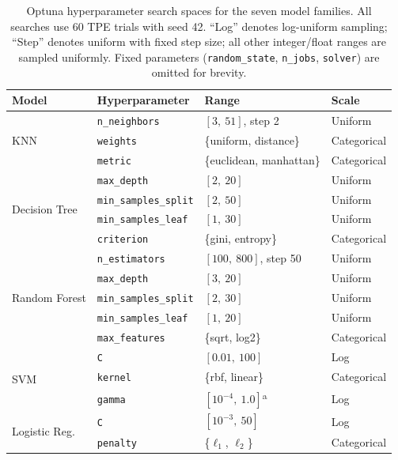 \begin{table}[ht!]
\centering
\caption[Optuna search spaces by model family]{Optuna hyperparameter search spaces for the seven model families.
All searches use 60 TPE trials with seed 42.
``Log'' denotes log-uniform sampling; ``Step'' denotes uniform with fixed step size; all other integer/float ranges are sampled uniformly.
Fixed parameters (\texttt{random\_state}, \texttt{n\_jobs}, \texttt{solver}) are omitted for brevity.}
\label{tab:optuna_spaces}
\footnotesize
\begin{tabular}{l l l l}
\toprule
Model & Hyperparameter & Range & Scale \\
\midrule
\multirow{3}{*}{KNN}
  & \texttt{n\_neighbors}     & $[3,\ 51]$, step 2   & Uniform \\
  & \texttt{weights}          & \{uniform, distance\} & Categorical \\
  & \texttt{metric}           & \{euclidean, manhattan\} & Categorical \\
\cmidrule{1-4}
\multirow{4}{*}{Decision Tree}
  & \texttt{max\_depth}         & $[2,\ 20]$   & Uniform \\
  & \texttt{min\_samples\_split} & $[2,\ 50]$   & Uniform \\
  & \texttt{min\_samples\_leaf}  & $[1,\ 30]$   & Uniform \\
  & \texttt{criterion}          & \{gini, entropy\} & Categorical \\
\cmidrule{1-4}
\multirow{5}{*}{Random Forest}
  & \texttt{n\_estimators}       & $[100,\ 800]$, step 50 & Uniform \\
  & \texttt{max\_depth}          & $[3,\ 20]$    & Uniform \\
  & \texttt{min\_samples\_split} & $[2,\ 30]$    & Uniform \\
  & \texttt{min\_samples\_leaf}  & $[1,\ 20]$    & Uniform \\
  & \texttt{max\_features}       & \{sqrt, log2\} & Categorical \\
\cmidrule{1-4}
\multirow{3}{*}{SVM}
  & \texttt{C}       & $[0.01,\ 100]$      & Log \\
  & \texttt{kernel}  & \{rbf, linear\}      & Categorical \\
  & \texttt{gamma}   & $[10^{-4},\ 1.0]$\textsuperscript{a} & Log \\
\cmidrule{1-4}
\multirow{2}{*}{Logistic Reg.}
  & \texttt{C}       & $[10^{-3},\ 50]$   & Log \\
  & \texttt{penalty} & \{$\ell_1$, $\ell_2$\} & Categorical \\

\end{tabular}
\end{table}
